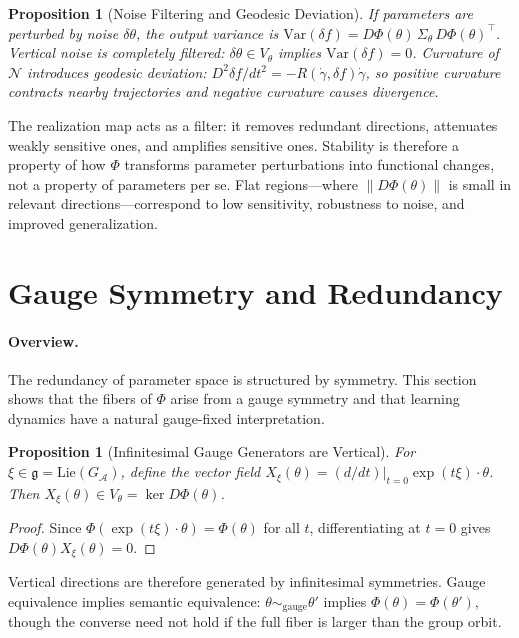 \documentclass[twocolumn,10pt]{article}
\theoremstyle{thmstyle}
\newtheorem{proposition}[theorem]{Proposition}
\theoremstyle{defstyle}
\begin{document}
\begin{proposition}[Noise Filtering and Geodesic Deviation]
If parameters are perturbed by noise $\delta\theta$, the output
variance is $\mathrm{Var}(\delta f) = D\Phi(\theta)\,\Sigma_\theta\,
D\Phi(\theta)^\top$. Vertical noise is completely filtered:
$\delta\theta \in V_\theta$ implies $\mathrm{Var}(\delta f) = 0$.
Curvature of $\mathcal{N}$ introduces geodesic deviation:
$D^2\delta f/dt^2 = -R(\dot\gamma,\delta f)\dot\gamma$, so positive
curvature contracts nearby trajectories and negative curvature causes
divergence.
\end{proposition}

The realization map acts as a filter: it removes redundant directions,
attenuates weakly sensitive ones, and amplifies sensitive ones.
Stability is therefore a property of how $\Phi$ transforms parameter
perturbations into functional changes, not a property of parameters per
se. Flat regions---where $\|D\Phi(\theta)\|$ is small in relevant
directions---correspond to low sensitivity, robustness to noise, and
improved generalization.

\section{Gauge Symmetry and Redundancy}
\label{sec:gauge}

\paragraph{Overview.}
The redundancy of parameter space is structured by symmetry. This
section shows that the fibers of $\Phi$ arise from a gauge symmetry
and that learning dynamics have a natural gauge-fixed interpretation.

\begin{proposition}[Infinitesimal Gauge Generators are Vertical]
For $\xi \in \mathfrak{g} = \mathrm{Lie}(G_\mathcal{A})$, define the
vector field $X_\xi(\theta) = (d/dt)|_{t=0}\exp(t\xi)\cdot\theta$.
Then $X_\xi(\theta) \in V_\theta = \ker D\Phi(\theta)$.
\end{proposition}

\begin{proof}
Since $\Phi(\exp(t\xi)\cdot\theta) = \Phi(\theta)$ for all $t$,
differentiating at $t=0$ gives $D\Phi(\theta)X_\xi(\theta) = 0$.
\end{proof}

Vertical directions are therefore generated by infinitesimal symmetries.
Gauge equivalence implies semantic equivalence:
$\theta \sim_{\mathrm{gauge}} \theta'$ implies $\Phi(\theta) =
\Phi(\theta')$, though the converse need not hold if the full fiber is
larger than the group orbit.
\end{document}
